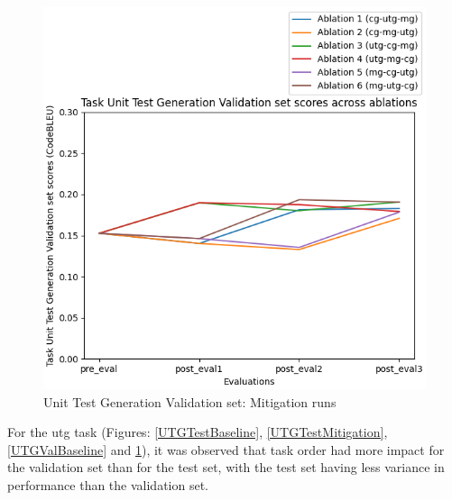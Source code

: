 \begin{figure}[H]
\begin{minipage}{0.45\textwidth}
        \includegraphics[width=1.1\textwidth]{Figures/results/code_mitigation_graphs/task_eval/seed_averaged_task_utg_val_eval_mitigation.png} %
        \captionsetup{width=1.1\textwidth}
        \caption{Unit Test Generation Validation set: Mitigation runs}
        \label{UTGValMitigation}
    \end{minipage}
\end{figure}
For the utg task (Figures: \ref{UTGTestBaseline}, \ref{UTGTestMitigation}, \ref{UTGValBaseline} and \ref{UTGValMitigation}), it was observed that task order had more impact for the validation set than for the test set, with the test set having less variance in performance than the validation set. 

